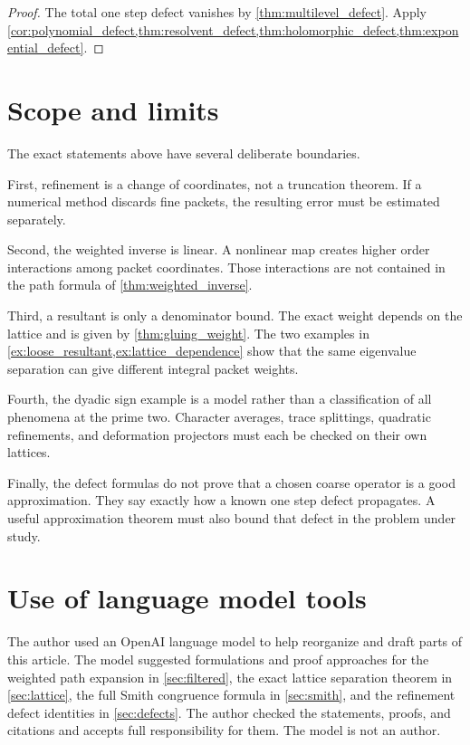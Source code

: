 \documentclass{aomart}
\theoremstyle{definition}
\theoremstyle{remark}
\begin{document}
\begin{proof}
The total one step defect vanishes by \cref{thm:multilevel_defect}.  Apply \cref{cor:polynomial_defect,thm:resolvent_defect,thm:holomorphic_defect,thm:exponential_defect}.
\end{proof}

\section{Scope and limits}\label{sec:limits}

The exact statements above have several deliberate boundaries.

First, refinement is a change of coordinates, not a truncation theorem.  If a numerical method discards fine packets, the resulting error must be estimated separately.

Second, the weighted inverse is linear.  A nonlinear map creates higher order interactions among packet coordinates.  Those interactions are not contained in the path formula of \cref{thm:weighted_inverse}.

Third, a resultant is only a denominator bound.  The exact weight depends on the lattice and is given by \cref{thm:gluing_weight}.  The two examples in \cref{ex:loose_resultant,ex:lattice_dependence} show that the same eigenvalue separation can give different integral packet weights.

Fourth, the dyadic sign example is a model rather than a classification of all phenomena at the prime two.  Character averages, trace splittings, quadratic refinements, and deformation projectors must each be checked on their own lattices.

Finally, the defect formulas do not prove that a chosen coarse operator is a good approximation.  They say exactly how a known one step defect propagates.  A useful approximation theorem must also bound that defect in the problem under study.

\section*{Use of language model tools}

The author used an OpenAI language model to help reorganize and draft parts of this article.  The model suggested formulations and proof approaches for the weighted path expansion in \cref{sec:filtered}, the exact lattice separation theorem in \cref{sec:lattice}, the full Smith congruence formula in \cref{sec:smith}, and the refinement defect identities in \cref{sec:defects}.  The author checked the statements, proofs, and citations and accepts full responsibility for them.  The model is not an author.



\end{document}
